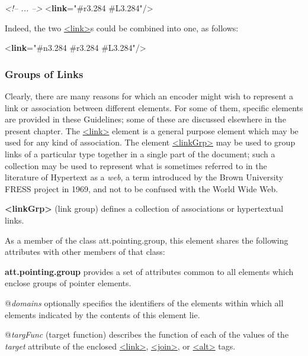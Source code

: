\begin{shaded}
\textit{<!-- ... -->}\mbox{}\newline 
{<\textbf{link}\hspace*{1em}{target}="{\#r3.284 \#L3.284}"/>}\end{shaded}\egroup\par \noindent   Indeed, the two \hyperref[TEI.link]{<link>}s could be combined into one, as follows: \par\bgroup{}\exampleFont \begin{shaded}\noindent\mbox{}{<\textbf{link}\hspace*{1em}{target}="{\#n3.284 \#r3.284 \#L3.284}"/>}\end{shaded}\egroup\par 
\subsubsection[{Groups of Links}]{Groups of Links}\label{SAPTLG}\par
Clearly, there are many reasons for which an encoder might wish to represent a link or association between different elements. For some of them, specific elements are provided in these Guidelines; some of these are discussed elsewhere in the present chapter. The \hyperref[TEI.link]{<link>} element is a general purpose element which may be used for any kind of association. The element \hyperref[TEI.linkGrp]{<linkGrp>} may be used to group links of a particular type together in a single part of the document; such a collection may be used to represent what is sometimes referred to in the literature of Hypertext as a \textit{web}, a term introduced by the Brown University FRESS project in 1969, and not to be confused with the World Wide Web. 
\begin{sansreflist}
  
\item [\textbf{<linkGrp>}] (link group) defines a collection of associations or hypertextual links.
\end{sansreflist}
 As a member of the class \textsf{att.pointing.group}, this element shares the following attributes with other members of that class: 
\begin{sansreflist}
  
\item [\textbf{att.pointing.group}] provides a set of attributes common to all elements which enclose groups of pointer elements.\hfil\\[-10pt]\begin{sansreflist}
    \item[@{\itshape domains}]
  optionally specifies the identifiers of the elements within which all elements indicated by the contents of this element lie.
    \item[@{\itshape targFunc}]
  (target function) describes the function of each of the values of the {\itshape target} attribute of the enclosed \hyperref[TEI.link]{<link>}, \hyperref[TEI.join]{<join>}, or \hyperref[TEI.alt]{<alt>} tags.
\end{sansreflist}  
\end{sansreflist}
